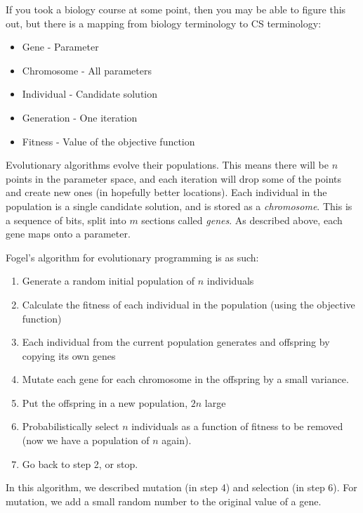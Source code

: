 If you took a biology course at some point, then you may be able to figure this
out, but there is a mapping from biology terminology to CS terminology:

\begin{itemize}
  \item Gene  - Parameter
  \item Chromosome - All parameters
  \item Individual - Candidate solution
  \item Generation - One iteration
  \item Fitness - Value of the objective function
\end{itemize}

Evolutionary algorithms evolve their populations. This means there will be $n$
points in the parameter space, and each iteration will drop some of the points
and create new ones (in hopefully better locations). Each individual in the 
population is a single candidate solution, and is stored as a
\textit{chromosome}. This is a sequence of bits, split into $m$ sections called
\textit{genes}. As described above, each gene maps onto a parameter.


Fogel's algorithm for evolutionary programming is as such:

\begin{enumerate}
  \item Generate a random initial population of $n$ individuals
  \item Calculate the fitness of each individual in the population (using the
  objective function)
  \item Each individual from the current population generates and offspring by
  copying its own genes
  \item Mutate each gene for each chromosome in the offspring by a small 
  variance.
  \item Put the offspring in a new population, $2n$ large
  \item Probabilistically select $n$ individuals as a function of fitness to be
  removed (now we have a population of $n$ again).
  \item Go back to step 2, or stop.
\end{enumerate}


In this algorithm, we described mutation (in step 4) and selection (in step 6).
For mutation, we add a small random number to the original value of a gene.

